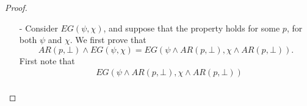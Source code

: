 \documentclass[10pt]{article}
\newcommand{\ARp}{{AR(p,\bot)}}
\begin{document}
\begin{proof}
\begin{itemize}
\begin{align*}
                &\leq\ARp\wedge(\psi\vee[\chi\wedge \diamond EU(\psi,\chi)])\mbox{ by monotonicity}\\
                &=\ARp\wedge EU(\psi,\chi).
            \end{align*}
            On the other hand, we will show that \[EU(\psi,\chi)\leq EU(\psi\wedge\ARp,\chi\wedge\ARp)\vee\neg\ARp.\] 
            By a least fixpoint argument using definition of $EU(\psi,\chi)$, a sufficient condition is 
            \begin{multline*}
                \psi\vee(\chi\wedge\diamond [EU(\psi\wedge\ARp,\chi\wedge\ARp)\vee\neg\ARp])\\
                \leq EU(\psi\wedge\ARp,\chi\wedge\ARp)\vee\neg\ARp.
            \end{multline*}
            Equivalently, by switching back $\ARp$ to the left side and by developing on the left, we only need to prove
            \begin{multline*}
                [\ARp\wedge(\psi\vee[\chi\wedge\diamond EU(\psi\wedge\ARp,\chi\wedge\ARp)])]\\
                \vee[\ARp\wedge\psi]\vee[\chi\wedge\ARp\wedge\diamond\neg\ARp]\\
                \leq EU(\psi\wedge\ARp,\chi\wedge\ARp)
            \end{multline*}
            As the left member simplifies, this is still equivalent to 
            \begin{multline*}
                [\ARp\wedge\psi]\vee[\ARp\wedge\chi\wedge\diamond EU(\psi\wedge\ARp,\chi\wedge\ARp)]\\
                \leq EU(\psi\wedge\ARp,\chi\wedge\ARp)
            \end{multline*}
            which is true by definition of $EU$. Therefore, the inequality is proven in both ways, which states our first equality.
            Now, by induction hypothesis, there are four cases, depending on the values of $AR(p,\bot)\wedge\psi$ and $AR(p,\bot)\wedge\chi$. In each case, it is straightforward to check that $EU(\psi\wedge AR(p,\bot),\chi\wedge AR(p,\bot))$ is either equal to $\bot$, or $AR(p,\bot)$, which concludes the proof for this point.
        \item[-] Consider $EG(\psi,\chi)$, and suppose that the property holds for some $p$, for both $\psi$ and $\chi$. We first prove that \[\ARp\wedge EG(\psi,\chi)=EG(\psi\wedge\ARp,\chi\wedge\ARp).\] First note that 
        \begin{align*}
            &EG(\psi\wedge\ARp,\chi\wedge\ARp)\\

\end{align*}
\end{itemize}
\end{proof}
\end{document}
